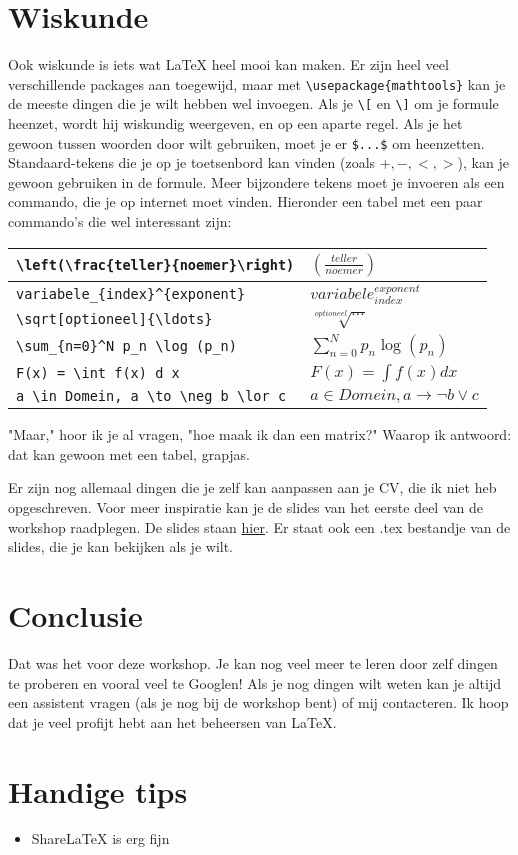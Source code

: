 \documentclass[a4paper,10pt]{article}
\begin{document}
\section{Wiskunde}
Ook wiskunde is iets wat LaTeX heel mooi kan maken. Er zijn heel veel verschillende packages aan toegewijd, maar met \verb|\usepackage{mathtools}| kan je de meeste dingen die je wilt hebben wel invoegen. Als je \verb|\[| en \verb|\]| om je formule heenzet, wordt hij wiskundig weergeven, en op een aparte regel. Als je het gewoon tussen woorden door wilt gebruiken, moet je er \verb|$...$| om heenzetten. Standaard-tekens die je op je toetsenbord kan vinden (zoals $+,-,<,>$), kan je gewoon gebruiken in de formule. Meer bijzondere tekens moet je invoeren als een commando, die je op internet moet vinden. Hieronder een tabel met een paar commando's die wel interessant zijn: 


\begin{tabular}{l | l}
\verb|\left(\frac{teller}{noemer}\right)| & \large{$\left(\frac{teller}{noemer}\right)$} \\ \hline
\verb|variabele_{index}^{exponent}| & \large{$variabele_{index}^{exponent}$} \\ \hline
\verb|\sqrt[optioneel]{\ldots}| & \large{$\sqrt[optioneel]{\ldots}$} \\ \hline
\verb|\sum_{n=0}^N p_n \log (p_n)| & \large{$\sum_{n=0}^N p_n \log (p_n)$} \\ \hline
\verb|F(x) = \int f(x) d x| & \large{$F(x) = \int f(x) d x$} \\ \hline
\verb|a \in Domein, a \to \neg b \lor c| & \large{$a \in Domein, a \to \neg b \lor c$} \\
\end{tabular}

"Maar," hoor ik je al vragen, "hoe maak ik dan een matrix?" Waarop ik antwoord: dat kan gewoon met een tabel, grapjas.

Er zijn nog allemaal dingen die je zelf kan aanpassen aan je CV, die ik niet heb opgeschreven. Voor meer inspiratie kan je de slides van het eerste deel van de workshop raadplegen. De slides staan \href{http://ctan.math.washington.edu/tex-archive/info/latex-course/}{hier}. Er staat ook een .tex bestandje van de slides, die je kan bekijken als je wilt.



\section{Conclusie}
Dat was het voor deze workshop. Je kan nog veel meer te leren door zelf dingen te proberen en vooral veel te Googlen! Als je nog dingen wilt weten kan je altijd een assistent vragen (als je nog bij de workshop bent) of mij contacteren. Ik hoop dat je veel profijt hebt aan het beheersen van \LaTeX.

\section{Handige tips}
\begin{itemize}
\item ShareLaTeX is erg fijn
\end{itemize}
\end{document}
